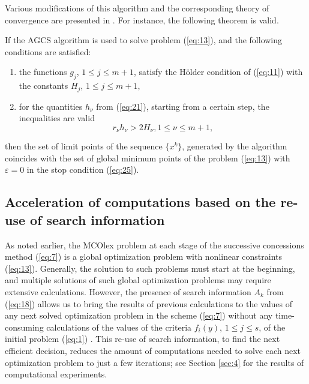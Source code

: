 \documentclass[smallextended]{svjour3}       %
\begin{document}
Various modifications of this algorithm and the corresponding theory of convergence are presented in \cite{c18}. For instance, the following theorem is valid.

\begin{theorem}
If the AGCS algorithm is used to solve problem (\ref{eq:13}), and the following conditions are satisfied:
\begin{enumerate}
	\item the functions $g_j$, $1 \leq j \leq m+1$,  satisfy the H\"older condition of (\ref{eq:11}) with the constants $H_j$, $1 \leq j \leq m+1$,
	\item for the quantities $h_\nu$ from (\ref{eq:21}), starting from a certain step, the inequalities are valid
\begin{equation*}
r_\nu h_\nu>2H_\nu, 1\leq \nu \leq m+1,
\end{equation*}
\end{enumerate}
then the set of limit points of the sequence $\{x^k\}$, generated by the algorithm coincides with the set of global minimum points of the problem (\ref{eq:13}) with $\varepsilon=0$ in the stop condition (\ref{eq:25}).
\end{theorem}

\subsection{Acceleration of computations based on the re-use of search information}

As noted earlier, the MCOlex problem at each stage of the successive concessions method (\ref{eq:7}) is a global optimization problem with nonlinear constraints (\ref{eq:13}). Generally, the solution to such problems must start at the beginning, and multiple solutions of such global optimization problems may require extensive calculations. However, the presence of search information $A_k$ from (\ref{eq:18}) allows us to bring the results of previous calculations to the values of any next solved optimization problem in the scheme (\ref{eq:7}) without any time-consuming calculations of the values of the criteria $f_i (y)$, $1 \leq j \leq s$,  of the initial problem (\ref{eq:1}) \cite{c30,c31}. This re-use of search information, to find the next efficient decision, reduces the amount of computations needed to solve each next optimization problem to just a few iterations; see Section \ref{sec:4} for the results of computational experiments.
\end{document}
